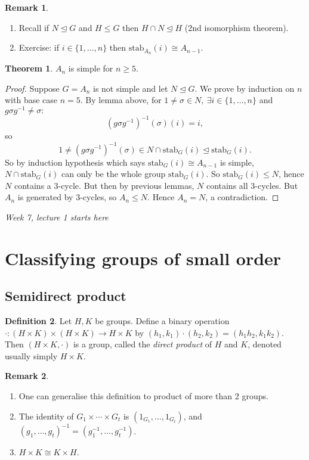 \documentclass[a4paper]{article}
\newcommand{\stab}{\text{stab}}
\theoremstyle{definition}
\newtheorem{defn}{Definition}[subsection]
\newtheorem{thm}[defn]{Theorem}
\newtheorem*{remark}{Remark}
\begin{document}
\begin{remark}
\begin{enumerate}
\item Recall if $N\unlhd G$ and $H\leq G$ then $H\cap N\unlhd H$ (2nd isomorphism theorem).
\item Exercise: if $i\in\{1,\ldots,n\}$ then $\stab_{A_n}(i)\cong A_{n-1}$.
\end{enumerate}
\end{remark}

\begin{thm}
$A_n$ is simple for $n\geq 5$.
\end{thm}
\begin{proof}
Suppose $G=A_n$ is not simple and let $N\unlhd G$. We prove by induction on $n$ with base case $n=5$. By lemma above, for $1\neq \sigma\in N,\ \exists i\in\{1,\ldots,n\}$ and $g\sigma g^{-1}\neq \sigma:$
\[
\left(g\sigma g^{-1}\right)^{-1} (\sigma) (i)=i,
\]
so
\[
1\neq \left(g\sigma g^{-1}\right)^{-1} (\sigma) \in N\cap \stab_G(i) \unlhd \stab_G(i).
\]
So by induction hypothesis which says $\stab_G(i)\cong A_{n-1}$ is simple, $N\cap \stab_G(i)$ can only be the whole group $\stab_G(i)$. So $\stab_G(i)\leq N$, hence $N$ contains a 3-cycle. But then by previous lemmas, $N$ contains all 3-cycles. But $A_n$ is generated by 3-cycles, so $A_n\leq N$. Hence $A_n=N$, a contradiction.
\end{proof}

\begin{flushright}
\textit{Week 7, lecture 1 starts here}
\end{flushright}

\section{Classifying groups of small order}
\subsection{Semidirect product}
\begin{defn}
Let $H,K$ be groups. Define a binary operation $\cdot:(H\times K)\times (H\times K)\rightarrow H\times K$ by $(h_1,k_1)\cdot (h_2,k_2)=(h_1h_2,k_1k_2)$. Then $(H\times K,\cdot)$ is a group, called the \textit{direct product} of $H$ and $K$, denoted usually simply $H\times K$.
\end{defn}
\begin{remark}
\begin{enumerate}
\item One can generalise this definition to product of more than 2 groups.
\item The identity of $G_1\times \cdots \times G_t$ is $\left(1_{G_1},\ldots,1_{G_t}\right)$, and $(g_1,\ldots,g_t)^{-1}=\left(g_1^{-1},\ldots,g_t^{-1}\right)$.
\item $H\times K\cong K\times H$.
\end{enumerate}
\end{remark}
\end{document}
